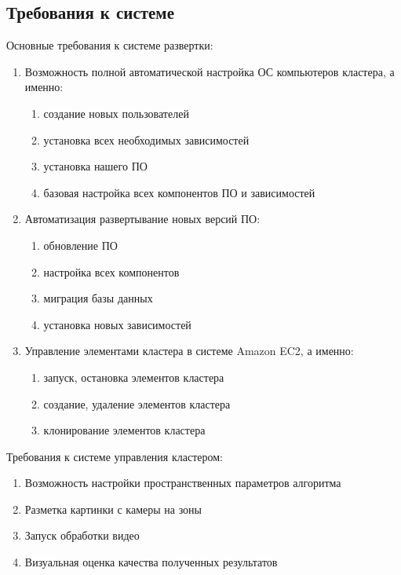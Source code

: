 \subsection{Требования к системе}

Основные требования к системе развертки:

\begin{enumerate}
  \item Возможность полной автоматической настройка ОС компьютеров кластера, а именно:
  \begin{enumerate}
    \item создание новых пользователей
    \item установка всех необходимых зависимостей
    \item установка нашего ПО
    \item базовая настройка всех компонентов ПО и зависимостей
  \end{enumerate}
  \item Автоматизация развертывание новых версий ПО:
  \begin{enumerate}
    \item обновление ПО
    \item настройка всех компонентов
    \item миграция базы данных
    \item установка новых зависимостей
  \end{enumerate}
  \item Управление элементами кластера в системе Amazon EC2, а именно:
  \begin{enumerate}
    \item запуск, остановка элементов кластера
    \item создание, удаление элементов кластера
    \item клонирование элементов кластера
  \end{enumerate}
\end{enumerate}

Требования к системе управления кластером:
\begin{enumerate}
  \item Возможность настройки пространственных параметров алгоритма
  \item Разметка картинки с камеры на зоны
  \item Запуск обработки видео
  \item Визуальная оценка качества полученных результатов
\end{enumerate}

